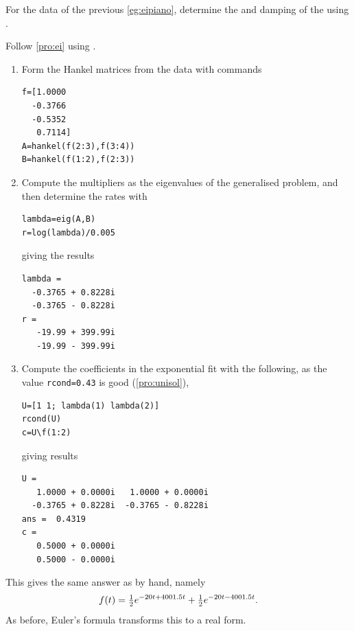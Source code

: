 \begin{example} \label{eg:eipianu}
For the data of the previous \autoref{eg:eipiano}, determine the  and damping of the  using \script.

\begin{solution} 
Follow \autoref{pro:ei} using \script. 
\begin{enumerate}
\item Form the Hankel matrices from the data with commands
\begin{verbatim}
f=[1.0000
  -0.3766
  -0.5352
   0.7114]
A=hankel(f(2:3),f(3:4))
B=hankel(f(1:2),f(2:3))
\end{verbatim}
\setbox\ajrqrbox\hbox{}%
\marginpar{\usebox{\ajrqrbox}}%

\item Compute the multipliers as the eigenvalues of the generalised problem, and then determine the rates with
\begin{verbatim}
lambda=eig(A,B)
r=log(lambda)/0.005
\end{verbatim}
giving the results
\begin{verbatim}
lambda =
  -0.3765 + 0.8228i
  -0.3765 - 0.8228i
r =
   -19.99 + 399.99i
   -19.99 - 399.99i
\end{verbatim}


\item Compute the coefficients in the exponential fit with the following, as the value \verb|rcond=0.43| is good (\autoref{pro:unisol}),
\begin{verbatim}
U=[1 1; lambda(1) lambda(2)]
rcond(U)
c=U\f(1:2)
\end{verbatim}
giving results
\begin{verbatim}
U =
   1.0000 + 0.0000i   1.0000 + 0.0000i
  -0.3765 + 0.8228i  -0.3765 - 0.8228i
ans =  0.4319
c =
   0.5000 + 0.0000i
   0.5000 - 0.0000i
\end{verbatim}
\end{enumerate}
This gives the same answer as by hand, namely 
\begin{equation*}
f(t)=\tfrac12e^{-20t+4001.5 t}+\tfrac12e^{-20t-4001.5 t}.
\end{equation*}
As before, Euler's formula transforms this to a real form.
\end{solution}
\end{example}




